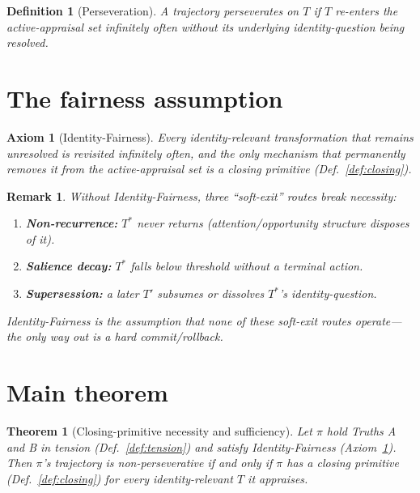 \documentclass[11pt]{article}
\newtheorem{definition}{Definition}
\newtheorem{axiom}{Axiom}
\newtheorem{theorem}{Theorem}
\newtheorem{remark}{Remark}
\begin{document}
\begin{definition}[Perseveration]
\label{def:perseveration}
A trajectory \emph{perseverates on $T$} if $T$ re-enters the active-appraisal set
infinitely often without its underlying identity-question being resolved.
\end{definition}

\section{The fairness assumption}

\begin{axiom}[Identity-Fairness]
\label{ax:fairness}
Every identity-relevant transformation that remains unresolved is revisited
infinitely often, and the \emph{only} mechanism that permanently removes it from
the active-appraisal set is a closing primitive (Def.~\ref{def:closing}).
\end{axiom}

\begin{remark}
Without Identity-Fairness, three ``soft-exit'' routes break necessity:
\begin{enumerate}
  \item \textbf{Non-recurrence:} $T^*$ never returns (attention/opportunity
        structure disposes of it).
  \item \textbf{Salience decay:} $T^*$ falls below threshold without a terminal
        action.
  \item \textbf{Supersession:} a later $T'$ subsumes or dissolves $T^*$'s
        identity-question.
\end{enumerate}
Identity-Fairness is the assumption that \emph{none} of these soft-exit routes
operate---the only way out is a hard commit/rollback.
\end{remark}

\section{Main theorem}

\begin{theorem}[Closing-primitive necessity and sufficiency]
\label{thm:main}
Let $\pi$ hold Truths A and B in tension (Def.~\ref{def:tension}) \emph{and}
satisfy Identity-Fairness (Axiom~\ref{ax:fairness}). Then $\pi$'s trajectory is
non-perseverative \emph{if and only if} $\pi$ has a closing primitive
(Def.~\ref{def:closing}) for every identity-relevant $T$ it appraises.
\end{theorem}
\end{document}
